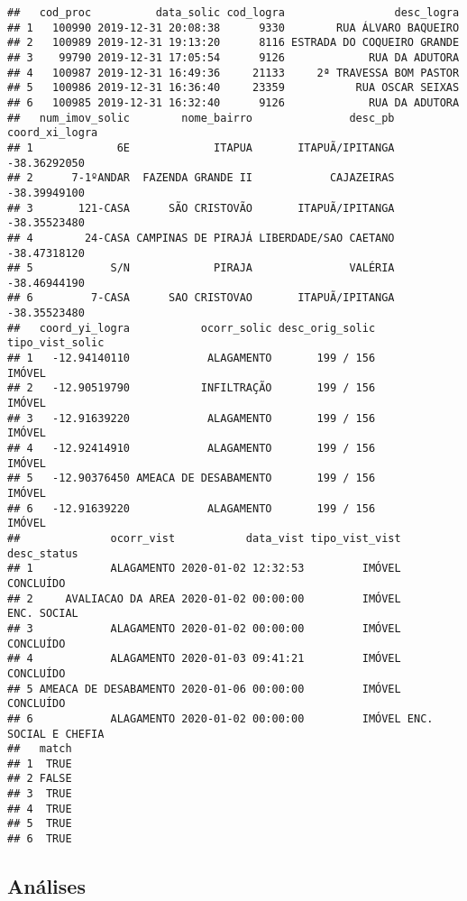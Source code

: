 \documentclass[
]{article}
\begin{document}
\begin{verbatim}
##   cod_proc          data_solic cod_logra                 desc_logra
## 1   100990 2019-12-31 20:08:38      9330        RUA ÁLVARO BAQUEIRO
## 2   100989 2019-12-31 19:13:20      8116 ESTRADA DO COQUEIRO GRANDE
## 3    99790 2019-12-31 17:05:54      9126             RUA DA ADUTORA
## 4   100987 2019-12-31 16:49:36     21133     2ª TRAVESSA BOM PASTOR
## 5   100986 2019-12-31 16:36:40     23359           RUA OSCAR SEIXAS
## 6   100985 2019-12-31 16:32:40      9126             RUA DA ADUTORA
##   num_imov_solic        nome_bairro               desc_pb coord_xi_logra
## 1             6E             ITAPUA       ITAPUÃ/IPITANGA   -38.36292050
## 2      7-1ºANDAR  FAZENDA GRANDE II            CAJAZEIRAS   -38.39949100
## 3       121-CASA      SÃO CRISTOVÃO       ITAPUÃ/IPITANGA   -38.35523480
## 4        24-CASA CAMPINAS DE PIRAJÁ LIBERDADE/SAO CAETANO   -38.47318120
## 5            S/N             PIRAJA               VALÉRIA   -38.46944190
## 6         7-CASA      SAO CRISTOVAO       ITAPUÃ/IPITANGA   -38.35523480
##   coord_yi_logra           ocorr_solic desc_orig_solic tipo_vist_solic
## 1   -12.94140110            ALAGAMENTO       199 / 156          IMÓVEL
## 2   -12.90519790           INFILTRAÇÃO       199 / 156          IMÓVEL
## 3   -12.91639220            ALAGAMENTO       199 / 156          IMÓVEL
## 4   -12.92414910            ALAGAMENTO       199 / 156          IMÓVEL
## 5   -12.90376450 AMEACA DE DESABAMENTO       199 / 156          IMÓVEL
## 6   -12.91639220            ALAGAMENTO       199 / 156          IMÓVEL
##              ocorr_vist           data_vist tipo_vist_vist          desc_status
## 1            ALAGAMENTO 2020-01-02 12:32:53         IMÓVEL            CONCLUÍDO
## 2     AVALIACAO DA AREA 2020-01-02 00:00:00         IMÓVEL          ENC. SOCIAL
## 3            ALAGAMENTO 2020-01-02 00:00:00         IMÓVEL            CONCLUÍDO
## 4            ALAGAMENTO 2020-01-03 09:41:21         IMÓVEL            CONCLUÍDO
## 5 AMEACA DE DESABAMENTO 2020-01-06 00:00:00         IMÓVEL            CONCLUÍDO
## 6            ALAGAMENTO 2020-01-02 00:00:00         IMÓVEL ENC. SOCIAL E CHEFIA
##   match
## 1  TRUE
## 2 FALSE
## 3  TRUE
## 4  TRUE
## 5  TRUE
## 6  TRUE
\end{verbatim}

\hypertarget{anuxe1lises}{%
\subsection{Análises}\label{anuxe1lises}}
\end{document}
